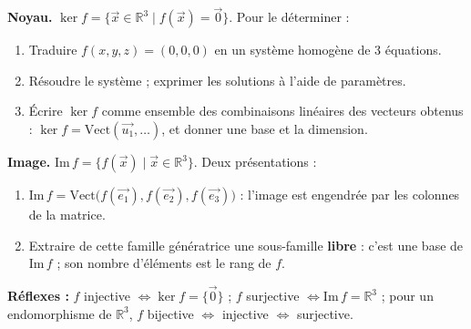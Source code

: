 \documentclass[11pt]{article}
\newcommand{\cle}[1]{{\popxbold\color{popdark}#1}}
\begin{document}
\begin{methode}
\textbf{Noyau.} $\ker f=\{\vec{x}\in\mathbb{R}^3 \mid f(\vec{x})=\vec{0}\}$. Pour le déterminer :
\begin{enumerate}
\item Traduire $f(x,y,z)=(0,0,0)$ en un système homogène de 3 équations.
\item Résoudre le système ; exprimer les solutions à l'aide de paramètres.
\item Écrire $\ker f$ comme ensemble des combinaisons linéaires des vecteurs obtenus : $\ker f=\mathrm{Vect}(\vec{u_1},\dots)$, et donner une base et la dimension.
\end{enumerate}
\textbf{Image.} $\mathrm{Im}\,f=\{f(\vec{x})\mid \vec{x}\in\mathbb{R}^3\}$. Deux présentations :
\begin{enumerate}
\item $\mathrm{Im}\,f=\mathrm{Vect}\big(f(\vec{e_1}),f(\vec{e_2}),f(\vec{e_3})\big)$ : l'image est engendrée par les colonnes de la matrice.
\item Extraire de cette famille génératrice une sous-famille \textbf{libre} : c'est une base de $\mathrm{Im}\,f$ ; son nombre d'éléments est le \cle{rang} de $f$.
\end{enumerate}
\textbf{Réflexes :} $f$ injective $\Leftrightarrow \ker f=\{\vec{0}\}$ ; $f$ surjective $\Leftrightarrow \mathrm{Im}\,f=\mathbb{R}^3$ ; pour un endomorphisme de $\mathbb{R}^3$, $f$ bijective $\Leftrightarrow$ injective $\Leftrightarrow$ surjective.
\end{methode}
\end{document}
